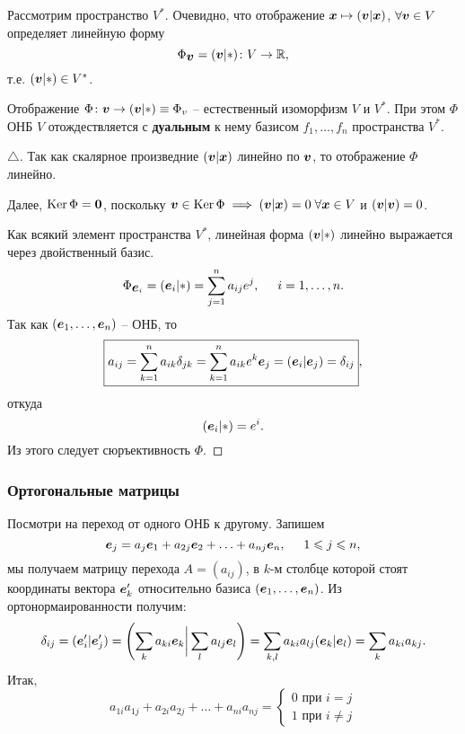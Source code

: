 Рассмотрим пространство $V^*$. Очевидно, что отображение $\mbox{\boldmath $x$} \mapsto (\mbox{\boldmath $v$} | \mbox{\boldmath $x$})$, $\forall \mbox{\boldmath $v$} \in V$ определяет линейную форму
$$
    \Phi_{\mbox{\boldmath $v$}} = (\mbox{\boldmath $v$} | *) \colon V \to \mathbb{R},
$$
т.е. $(\mbox{\boldmath $v$} | *) \in V^*$.


\begin{to_thr}
    Отображение $\Phi \colon \mbox{\boldmath $v$} \to (\mbox{\boldmath $v$} | *) \equiv \Phi_{v}$ -- естественный изоморфизм $V$ и $V^{*}$. При этом $\Phi$ ОНБ $V$ отождествляется с \textbf{дуальным} к нему базисом $f_1, \dots, f_n$ пространства $V^*$. 
\end{to_thr}

\begin{proof}[$\triangle$]
    Так как скалярное произведние $(\mbox{\boldmath $v$} | \mbox{\boldmath $x$})$ линейно по $\mbox{\boldmath $v$}$, то отображение $\Phi$ линейно. 

    Далее, $\mathop{\mathrm{Ker}}\nolimits \Phi = \mbox{\boldmath $0$}$, поскольку $\mbox{\boldmath $v$} \in \mathop{\mathrm{Ker}}\nolimits \Phi \; \Longrightarrow \; (\mbox{\boldmath $v$} | \mbox{\boldmath $x$}) = 0 \; \forall \mbox{\boldmath $x$} \in V$ и $(\mbox{\boldmath $v$} | \mbox{\boldmath $v$}) = 0$. 

    Как всякий элемент пространства $V^*$, линейная форма $(\mbox{\boldmath $v$} | *)$ линейно выражается через двойственный базис. 
    $$
        \Phi_{\mbox{\boldmath $e$}_i} = (\mbox{\boldmath $e$}_i | *) = \sum_{j=1}^n a_{ij} e^j, \hspace{0.5cm} i = 1, \ldots, n.   
    $$
    Так как $(\mbox{\boldmath $e$}_{1}, \ldots, \mbox{\boldmath $e$}_n)$ -- ОНБ, то
    $$
    \boxed{
        a_{ij} = \sum_{k=1}^n a_{ik} \delta_{jk} = \sum_{k=1}^n a_{ik} e^k \mbox{\boldmath $e$}_j = (\mbox{\boldmath $e$}_i | \mbox{\boldmath $e$}_j) = \delta_{ij}
        },
    $$
    откуда
    $$
        (\mbox{\boldmath $e$}_i | *) = e^i.
    $$
    Из этого следует сюръективность $\Phi$. 
\end{proof}



\subsubsection{Ортогональные матрицы}

Посмотри на переход от одного ОНБ к другому. Запишем
$$
    \mbox{\boldmath $e$}_j = a_{j} \mbox{\boldmath $e$}_{1} + a_{2j}\mbox{\boldmath $e$}_{2} + \ldots + a_{nj} \mbox{\boldmath $e$}_n, 
    \hspace{0.5cm}  1 \leqslant j \leqslant n,
$$
мы получаем матрицу перехода $A = (a_{ij})$, в $k$-м столбце которой стоят координаты вектора $\mbox{\boldmath $e$}_k'$ относительно базиса $(\mbox{\boldmath $e$}_{1}, \ldots, \mbox{\boldmath $e$}_n)$. Из ортонормаированности получим:
$$
    \delta_{ij} = (\mbox{\boldmath $e$}'_i | \mbox{\boldmath $e$}_j') = \left(
    \sum_k a_{ki} \mbox{\boldmath $e$}_k \bigg| \sum_l a_{lj} \mbox{\boldmath $e$}_l \right) = 
    \sum_{k, l} a_{ki} a_{lj} (\mbox{\boldmath $e$}_k | \mbox{\boldmath $e$}_l) = \sum_k a_{ki} a_{kj}.
$$
Итак, 
\begin{equation}
\label{l_1}
    a_{1i} a_{1j} + a_{2i} a_{2j} + \ldots + a_{ni} a_{nj} = 
    \left\{
    \begin{aligned}
        0 \text{ при } i = j \\
        1 \text{ при } i \neq j
    \end{aligned}
    \right.
\end{equation}

